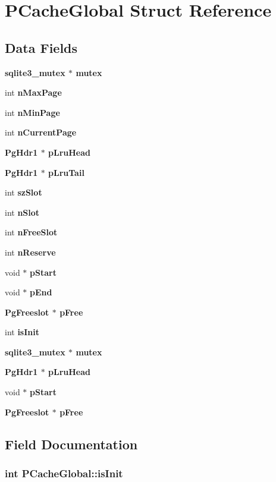 \section{PCache\-Global Struct Reference}
\label{structPCacheGlobal}
\subsection*{Data Fields}
\begin{CompactItemize}
\item 
\bf{sqlite3\_\-mutex} $\ast$ \bf{mutex}
\item 
int \bf{n\-Max\-Page}
\item 
int \bf{n\-Min\-Page}
\item 
int \bf{n\-Current\-Page}
\item 
\bf{Pg\-Hdr1} $\ast$ \bf{p\-Lru\-Head}
\item 
\bf{Pg\-Hdr1} $\ast$ \bf{p\-Lru\-Tail}
\item 
int \bf{sz\-Slot}
\item 
int \bf{n\-Slot}
\item 
int \bf{n\-Free\-Slot}
\item 
int \bf{n\-Reserve}
\item 
void $\ast$ \bf{p\-Start}
\item 
void $\ast$ \bf{p\-End}
\item 
\bf{Pg\-Freeslot} $\ast$ \bf{p\-Free}
\item 
int \bf{is\-Init}
\item 
\bf{sqlite3\_\-mutex} $\ast$ \bf{mutex}
\item 
\bf{Pg\-Hdr1} $\ast$ \bf{p\-Lru\-Head}
\item 
void $\ast$ \bf{p\-Start}
\item 
\bf{Pg\-Freeslot} $\ast$ \bf{p\-Free}
\end{CompactItemize}


\subsection{Field Documentation}
\subsubsection{\setlength{\rightskip}{0pt plus 5cm}int \bf{PCache\-Global::is\-Init}}\label{structPCacheGlobal_9e63e1d3326bd550c5a3cafd6b6d6278}



